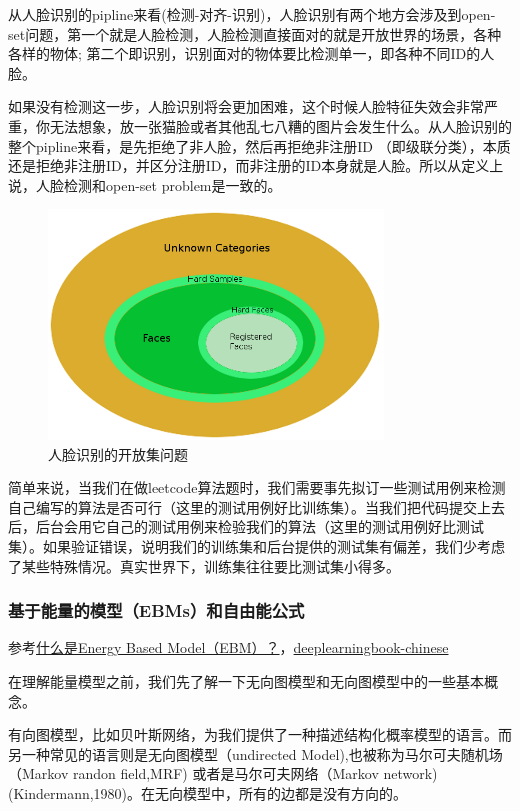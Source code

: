 从人脸识别的pipline来看(检测-对齐-识别)，人脸识别有两个地方会涉及到open-set问题，第一个就是人脸检测，人脸检测直接面对的就是开放世界的场景，各种各样的物体; 第二个即识别，识别面对的物体要比检测单一，即各种不同ID的人脸。

如果没有检测这一步，人脸识别将会更加困难，这个时候人脸特征失效会非常严重，你无法想象，放一张猫脸或者其他乱七八糟的图片会发生什么。从人脸识别的整个pipline来看，是先拒绝了非人脸，然后再拒绝非注册ID （即级联分类），本质还是拒绝非注册ID，并区分注册ID，而非注册的ID本身就是人脸。所以从定义上说，人脸检测和open-set problem是一致的。

\begin{figure}
  \centering
  \includegraphics[width=3.5in]{figure/example/openSet3.png}
  \caption{人脸识别的开放集问题}\label{fig:2-3}
\end{figure}

简单来说，当我们在做leetcode算法题时，我们需要事先拟订一些测试用例来检测自己编写的算法是否可行（这里的测试用例好比训练集）。当我们把代码提交上去后，后台会用它自己的测试用例来检验我们的算法（这里的测试用例好比测试集）。如果验证错误，说明我们的训练集和后台提供的测试集有偏差，我们少考虑了某些特殊情况。真实世界下，训练集往往要比测试集小得多。\\

\subsubsection{基于能量的模型（EBMs）和自由能公式}

参考\href{https://www.zhihu.com/question/59264464/answer/203701292}{什么是Energy Based Model（EBM）？}，\href{https://github.com/exacity/deeplearningbook-chinese}{deeplearningbook-chinese}

在理解能量模型之前，我们先了解一下无向图模型和无向图模型中的一些基本概念。

有向图模型，比如贝叶斯网络，为我们提供了一种描述结构化概率模型的语言。而另一种常见的语言则是无向图模型（undirected Model),也被称为马尔可夫随机场（Markov randon field,MRF) 或者是马尔可夫网络（Markov network)(Kindermann,1980)。在无向模型中，所有的边都是没有方向的。

